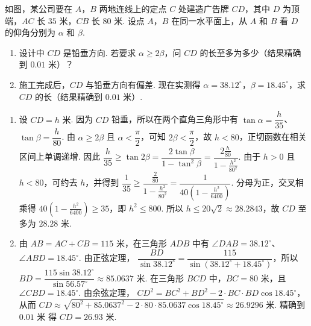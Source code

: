 \begin{problem}
如图，某公司要在 \(A\)，\(B\) 两地连线上的定点 \(C\) 处建造广告牌 \(CD\)，其中 \(D\) 为顶端，\(AC\) 长 \(35\text{ 米}\)，\(CB\) 长 \(80\text{ 米}\). 设点 \(A\)，\(B\) 在同一水平面上，从 \(A\) 和 \(B\) 看 \(D\) 的仰角分别为 \(\alpha\) 和 \(\beta\).

\begin{enumerate}
\item 设计中 \(CD\) 是铅垂方向. 若要求 \(\alpha \geqslant 2\beta\)，问 \(CD\) 的长至多为多少（结果精确到 \(0.01\text{ 米}\)）？
\item 施工完成后，\(CD\) 与铅垂方向有偏差. 现在实测得 \(\alpha = 38.12^{\circ}\)，\(\beta = 18.45^{\circ}\)，求 \(CD\) 的长（结果精确到 \(0.01\text{ 米}\)）.
\end{enumerate}


\begin{solution}
\begin{enumerate}
\item 设 \(CD=h\text{ 米}\). 因为 \(CD\) 铅垂，所以在两个直角三角形中有 \(\tan\alpha=\dfrac h{35}\)、\(\tan\beta=\dfrac h{80}\). 由 \(\alpha\geqslant2\beta\) 且 \(\alpha<\dfrac\pi2\)，可知 \(2\beta<\dfrac\pi2\)，故 \(h<80\)，正切函数在相关区间上单调递增. 因此
\(\dfrac h{35}\geqslant\tan2\beta=\dfrac{2\tan\beta}{1-\tan^2\beta}=\dfrac{2\frac{h}{80}}{1-\frac{h^2}{80^2}}\).
由于 \(h>0\) 且 \(h<80\)，可约去 \(h\)，并得到
\(\dfrac1{35}\geqslant\dfrac{\frac{2}{80}}{1-\frac{h^2}{80^2}}=\dfrac1{40\left(1-\frac{h^2}{6400}\right)}\).
分母为正，交叉相乘得 \(40\left(1-\frac{h^2}{6400}\right)\geqslant35\)，即 \(h^2\leqslant800\). 所以 \(h\leqslant20\sqrt2\approx28.2843\)，故 \(CD\) 至多为 \(28.28\text{ 米}\).
\item 由 \(AB=AC+CB=115\text{ 米}\)，在三角形 \(ADB\) 中有 \(\angle DAB=38.12^{\circ}\)、\(\angle ABD=18.45^{\circ}\). 由正弦定理，
\(\dfrac{BD}{\sin38.12^{\circ}}=\dfrac{115}{\sin\left(38.12^{\circ}+18.45^{\circ}\right)}\)，所以
\(BD=\dfrac{115\sin38.12^{\circ}}{\sin56.57^{\circ}}\approx85.0637\text{ 米}\).
在三角形 \(BCD\) 中，\(BC=80\text{ 米}\)，且 \(\angle CBD=18.45^{\circ}\). 由余弦定理，
\(CD^2=BC^2+BD^2-2\cdot BC\cdot BD\cos18.45^{\circ}\)，从而
\(CD\approx\sqrt{80^2+85.0637^2-2\cdot80\cdot85.0637\cos18.45^{\circ}}\approx26.9296\text{ 米}\). 精确到 \(0.01\text{ 米}\) 得 \(CD=26.93\text{ 米}\).
\end{enumerate}
\end{solution}
\end{problem}

